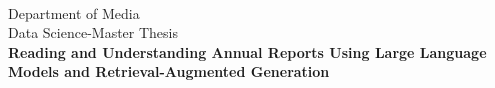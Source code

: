\documentclass[12pt]{article}
\def \DEPARTEMENT {Department of Media}
\def \COURSENUM {Data Science}
\def \COURSENAME {Master Thesis}
\def \REPORTTITLE {Reading and Understanding Annual Reports Using Large Language Models and Retrieval-Augmented Generation}
\begin{document}

\begin{titlepage}
    \vfill
    \begin{center}
        \hfill \\
        \Large{\DEPARTEMENT} \\
        \Large{\COURSENUM\;-\;\COURSENAME} \\
        \vfill
        \vfill
        \vfill
        \textbf{\LARGE{\REPORTTITLE}}
    \end{center}
    \vfill
    \vfill
    \vfill
    \vfill
    \vfill
    \begin{flushleft}
    \end{flushleft}
    \vfill
\end{titlepage}






\newpage

\tableofcontents

\newpage

\fancyfoot[C]{\thepage}




\newpage


\newpage


\newpage


\newpage


\newpage


\label{EndOfText}

\newpage


\label{endOfDoc}






\end{document}
